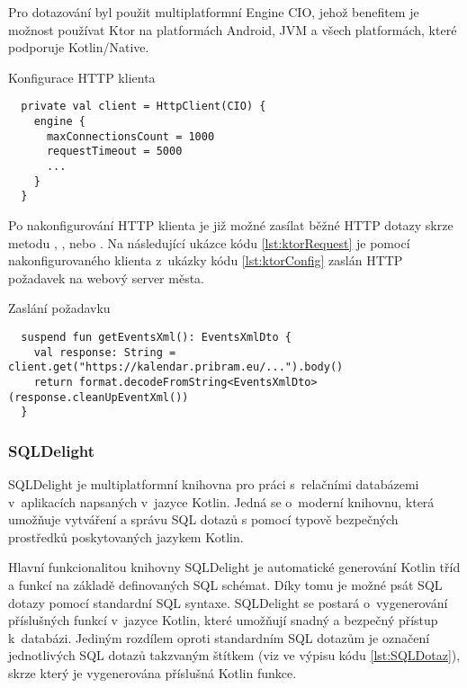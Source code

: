 Pro dotazování byl použit multiplatformní Engine CIO, jehož benefitem je možnost používat Ktor na platformách Android, JVM a všech platformách, které podporuje Kotlin/Native.
\begin{listing}[H]
\caption{Konfigurace HTTP klienta}\label{lst:ktorConfig}
\begin{verbatim}
  private val client = HttpClient(CIO) {
    engine {
      maxConnectionsCount = 1000
      requestTimeout = 5000
      ...
    }
  }
\end{verbatim}
\end{listing}

Po nakonfigurování HTTP klienta je již možné zasílat běžné HTTP dotazy skrze metodu , ,  nebo .
Na následující ukázce kódu \ref{lst:ktorRequest} je pomocí nakonfigurovaného klienta z~ukázky kódu \ref{lst:ktorConfig} zaslán HTTP požadavek
na webový server města.

\begin{listing}[H]
\caption{Zaslání požadavku}\label{lst:ktorRequest}
\begin{verbatim}
  suspend fun getEventsXml(): EventsXmlDto {
    val response: String = client.get("https://kalendar.pribram.eu/...").body()
    return format.decodeFromString<EventsXmlDto>(response.cleanUpEventXml())
  }
\end{verbatim}
\end{listing}

\subsubsection*{SQLDelight}
SQLDelight je multiplatformní knihovna pro práci s~relačními databázemi v~aplikacích napsaných v~jazyce Kotlin. Jedná se o~moderní knihovnu, 
která umožňuje vytváření a správu SQL dotazů s pomocí typově bezpečných prostředků poskytovaných jazykem Kotlin.

\medskip

Hlavní funkcionalitou knihovny SQLDelight je automatické generování Kotlin tříd a funkcí na základě definovaných SQL schémat. Díky tomu
je možné psát SQL dotazy pomocí standardní SQL syntaxe. SQLDelight se postará o~vygenerování příslušných funkcí v~jazyce Kotlin, které
umožňují  snadný a bezpečný přístup k~databázi. Jediným rozdílem oproti standardním SQL dotazům je označení jednotlivých SQL dotazů takzvaným 
štítkem (viz  ve výpisu kódu \ref{lst:SQLDotaz}), skrze který je vygenerována příslušná Kotlin funkce. 

